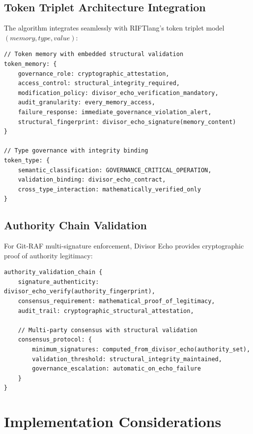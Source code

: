 \documentclass[11pt,letterpaper]{article}
\begin{document}
\subsection{Token Triplet Architecture Integration}

The algorithm integrates seamlessly with RIFTlang's token triplet model $(memory, type, value)$:

\begin{lstlisting}[language=rift, caption=Token Authentication via Divisor Echo]
// Token memory with embedded structural validation
token_memory: {
    governance_role: cryptographic_attestation,
    access_control: structural_integrity_required,
    modification_policy: divisor_echo_verification_mandatory,
    audit_granularity: every_memory_access,
    failure_response: immediate_governance_violation_alert,
    structural_fingerprint: divisor_echo_signature(memory_content)
}

// Type governance with integrity binding
token_type: {
    semantic_classification: GOVERNANCE_CRITICAL_OPERATION,
    validation_binding: divisor_echo_contract,
    cross_type_interaction: mathematically_verified_only
}
\end{lstlisting}

\subsection{Authority Chain Validation}

For Git-RAF multi-signature enforcement, Divisor Echo provides cryptographic proof of authority legitimacy:

\begin{lstlisting}[language=rift, caption=Authority Validation Protocol]
authority_validation_chain {
    signature_authenticity: divisor_echo_verify(authority_fingerprint),
    consensus_requirement: mathematical_proof_of_legitimacy,
    audit_trail: cryptographic_structural_attestation,
    
    // Multi-party consensus with structural validation
    consensus_protocol: {
        minimum_signatures: computed_from_divisor_echo(authority_set),
        validation_threshold: structural_integrity_maintained,
        governance_escalation: automatic_on_echo_failure
    }
}
\end{lstlisting}

\section{Implementation Considerations}
\end{document}
